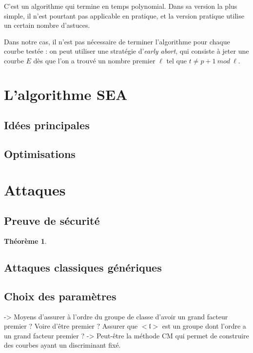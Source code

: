 \documentclass[11pt,a4paper]{article}
\renewcommand{\frak}{\mathfrak}
\newtheorem*{thm}{Théorème}
\theoremstyle{definition}
\begin{document}
C'est un algorithme qui termine en temps polynomial. Dans sa version la plus simple, il n'est pourtant pas applicable en pratique, et la version pratique utilise un certain nombre d'astuces.

Dans notre cas, il n'est pas nécessaire de terminer l'algorithme pour chaque courbe testée : on peut utiliser une stratégie d'\emph{early abort}, qui consiste à jeter une courbe $E$ dès que l'on a trouvé un nombre premier $\ell$ tel que $t\neq p+1\ mod\ \ell.$

\newpage

\section{L'algorithme SEA}

\subsection{Idées principales}

\subsection{Optimisations}


\newpage

\section{Attaques}


\subsection{Preuve de sécurité}


\begin{thm}

\end{thm}


\subsection{Attaques classiques génériques}


\subsection{Choix des paramètres}

-> Moyens d'assurer à l'ordre du groupe de classe d'avoir un grand facteur premier ? Voire d'être premier ? Assurer que $<\frak l>$ est un groupe dont l'ordre a un grand facteur premier ?
-> Peut-être la méthode CM qui permet de construire des courbes ayant un discriminant fixé.
\end{document}
